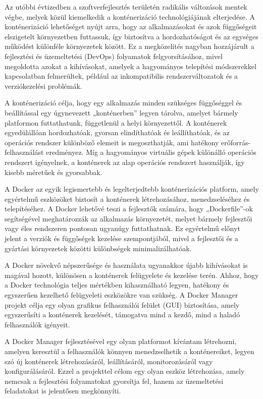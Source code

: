
Az utóbbi évtizedben a szoftverfejlesztés területén radikális változások mentek végbe, melyek közül kiemelkedik a konténerizáció technológiájának elterjedése. A konténerizáció lehetőséget nyújt arra, hogy az alkalmazásokat és azok függőségeit elszigetelt környezetben futtassuk, így biztosítva a hordozhatóságot és az egységes működést különféle környezetek között. Ez a megközelítés nagyban hozzájárult a fejlesztési és üzemeltetési (DevOps) folyamatok felgyorsításához, mivel megoldotta azokat a kihívásokat, amelyek a hagyományos telepítési módszerekkel kapcsolatban felmerültek, például az inkompatibilis rendszerváltozatok és a verziókezelési problémák.

A konténerizáció célja, hogy egy alkalmazás minden szükséges függőséggel és beállítással egy úgynevezett „konténerben” legyen tárolva, amelyet bármely platformon futtathatunk, függetlenül a helyi környezettől. A konténerek egyedülállóan hordozhatóak, gyorsan elindíthatóak és leállíthatóak, és az operációs rendszer különböző elemeit is megoszthatják, ami hatékony erőforrás-felhasználást eredményez. Míg a hagyományos virtuális gépek különálló operációs rendszert igényelnek, a konténerek az alap operációs rendszert használják, így kisebb méretűek és gyorsabbak.

A Docker az egyik legismertebb és legelterjedtebb konténerizációs platform, amely egyértelmű eszközöket biztosít a konténerek létrehozásához, menedzseléséhez és telepítéséhez. A Docker lehetővé teszi a fejlesztők számára, hogy „Dockerfile”-ok segítségével meghatározzák az alkalmazás környezetét, melyet bármely fejlesztői vagy éles rendszeren pontosan ugyanúgy futtathatnak. Ez egyértelmű előnyt jelent a verziók és függőségek kezelése szempontjából, mivel a fejlesztői és a gyártási környezetek közötti különbségek minimalizálhatóak.

A Docker növekvő népszerűsége és használata ugyanakkor újabb kihívásokat is magával hozott, különösen a konténerek felügyelete és kezelése terén. Ahhoz, hogy a Docker technológia teljes mértékben kihasználható legyen, hatékony és egyszerűen kezelhető felügyeleti eszközökre van szükség. A Docker Manager projekt célja egy olyan grafikus felhasználói felület (GUI) biztosítása, amely egyszerűsíti a konténerek kezelését, támogatva mind a kezdő, mind a haladó felhasználók igényeit.

A Docker Manager fejlesztésével egy olyan platformot kívántam létrehozni, amelyen keresztül a felhasználók könnyen menedzselhetik a konténereiket, legyen szó új konténerek létrehozásáról, leállításáról, monitorozásáról vagy konfigurálásáról. Ezzel a projekttel célom egy olyan eszköz létrehozása, amely nemcsak a fejlesztési folyamatokat gyorsítja fel, hanem az üzemeltetési feladatokat is jelentősen megkönnyíti.

